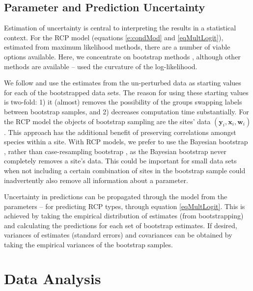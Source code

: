 \documentclass{statsoc}
\newcommand{\vy}{\bm{y}}
\newcommand{\vx}{\bm{x}}
\newcommand{\vw}{\bm{w}}
\begin{document}
\subsection{Parameter and Prediction Uncertainty} \label{SectBoot}

Estimation of uncertainty is central to interpreting the results in a statistical context. For the RCP model (equations \eqref{e:condMod} and \eqref{eqMultLogit}), estimated from maximum likelihood methods, there are a number of viable options available. Here, we concentrate on bootstrap methods \citep[see][]{dav97}, although other methods are available -- \citet{fos13} used the curvature of the log-likelihood.

We follow \citet{mcl00} and use the estimates from the un-perturbed data as starting values for each of the bootstrapped data sets. The reason for using these starting values is two-fold: 1) it (almost) removes the possibility of the groups swapping labels between bootstrap samples, and 2) decreases computation time substantially. For the RCP model the objects of bootstrap sampling are the sites' data $(\vy_i, \vx_i, \vw_i)$. This approach has the additional benefit of preserving correlations amongst species within a site. With RCP models, we prefer to use the Bayesian bootstrap \citep{rub81}, rather than case-resampling bootstrap \citep[see][]{dav97}, as the Bayesian bootstrap never completely removes a site's data. This could be important for small data sets when not including a certain combination of sites in the bootstrap sample could inadvertently also remove all information about a parameter. %


Uncertainty in predictions can be propagated through the model from the parameters -- for predicting RCP types, through equation \eqref{eqMultLogit}. This is achieved by taking the empirical distribution of estimates (from bootstrapping) and calculating the predictions for each set of bootstrap estimates. If desired, variances of estimates (standard errors) and covariances can be obtained by taking the empirical variances of the bootstrap samples.

\section{Data Analysis}
\end{document}
